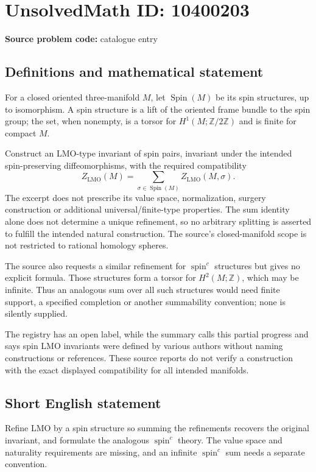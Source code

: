 \documentclass[11pt]{article}
\begin{document}
\section*{UnsolvedMath ID: 10400203}
\textbf{Source problem code:} catalogue entry
\subsection{Definitions and mathematical statement}
For a closed oriented three-manifold \(M\), let \(\operatorname{Spin}(M)\) be its spin structures, up to isomorphism. A spin structure is a lift of the oriented frame bundle to the spin group; the set, when nonempty, is a torsor for \(H^1(M;\mathbb Z/2\mathbb Z)\) and is finite for compact \(M\).

Construct an LMO-type invariant of spin pairs, invariant under the intended spin-preserving diffeomorphisms, with the required compatibility
\[
 Z_{\mathrm{LMO}}(M)=\sum_{\sigma\in\operatorname{Spin}(M)}
 Z_{\mathrm{LMO}}(M,\sigma).
\]
The excerpt does not prescribe its value space, normalization, surgery construction or additional universal/finite-type properties. The sum identity alone does not determine a unique refinement, so no arbitrary splitting is asserted to fulfill the intended natural construction. The source's closed-manifold scope is not restricted to rational homology spheres.

The source also requests a similar refinement for \(\operatorname{spin}^c\) structures but gives no explicit formula. Those structures form a torsor for \(H^2(M;\mathbb Z)\), which may be infinite. Thus an analogous sum over all such structures would need finite support, a specified completion or another summability convention; none is silently supplied.

The registry has an open label, while the summary calls this partial progress and says spin LMO invariants were defined by various authors without naming constructions or references. These source reports do not verify a construction with the exact displayed compatibility for all intended manifolds.
\subsection{Short English statement}
Refine LMO by a spin structure so summing the refinements recovers the original invariant, and formulate the analogous \(\operatorname{spin}^c\) theory. The value space and naturality requirements are missing, and an infinite \(\operatorname{spin}^c\) sum needs a separate convention.
\end{document}
